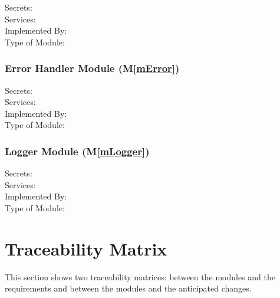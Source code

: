 \documentclass[12pt, titlepage]{article}
\newcommand{\mref}[1]{M\ref{#1}}
\begin{document}
\begin{description}
\item[Secrets:]
\item[Services:]
\item[Implemented By:] \progname
\item[Type of Module:]
\end{description}

\subsubsection{Error Handler Module (\mref{mError})}

\begin{description}
\item[Secrets:]
\item[Services:]
\item[Implemented By:] \progname
\item[Type of Module:]
\end{description}

\subsubsection{Logger Module (\mref{mLogger})}

\begin{description}
\item[Secrets:]
\item[Services:]
\item[Implemented By:] \progname
\item[Type of Module:]
\end{description}

\section{Traceability Matrix} \label{SecTM}

This section shows two traceability matrices: between the modules and the
requirements and between the modules and the anticipated changes.
\end{document}
